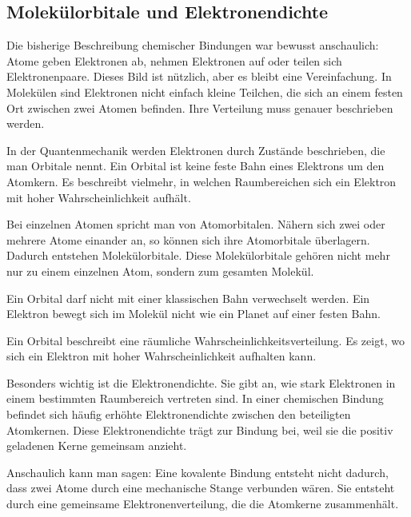 \subsection{Molekülorbitale und Elektronendichte}
\label{subsec:molekuelorbitale-elektronendichte}

Die bisherige Beschreibung chemischer Bindungen war bewusst anschaulich:
Atome geben Elektronen ab, nehmen Elektronen auf oder teilen sich
Elektronenpaare. Dieses Bild ist nützlich, aber es bleibt eine Vereinfachung.
In Molekülen sind Elektronen nicht einfach kleine Teilchen, die sich an einem
festen Ort zwischen zwei Atomen befinden. Ihre Verteilung muss genauer
beschrieben werden.

In der Quantenmechanik werden Elektronen durch Zustände beschrieben, die man
Orbitale nennt. Ein Orbital ist keine feste Bahn eines Elektrons
um den Atomkern. Es beschreibt vielmehr, in welchen Raumbereichen sich ein
Elektron mit hoher Wahrscheinlichkeit aufhält.

Bei einzelnen Atomen spricht man von Atomorbitalen. Nähern
sich zwei oder mehrere Atome einander an, so können sich ihre Atomorbitale
überlagern. Dadurch entstehen Molekülorbitale. Diese
Molekülorbitale gehören nicht mehr nur zu einem einzelnen Atom, sondern zum
gesamten Molekül.

\begin{DidacticBox}
	\label{box:orbital-keine-kreisbahn}
	Ein Orbital darf nicht mit einer klassischen Bahn verwechselt werden. Ein
	Elektron bewegt sich im Molekül nicht wie ein Planet auf einer festen Bahn.
	
	Ein Orbital beschreibt eine räumliche Wahrscheinlichkeitsverteilung. Es zeigt,
	wo sich ein Elektron mit hoher Wahrscheinlichkeit aufhalten kann.
\end{DidacticBox}

Besonders wichtig ist die Elektronendichte. Sie gibt
an, wie stark Elektronen in einem bestimmten Raumbereich vertreten sind. In
einer chemischen Bindung befindet sich häufig erhöhte Elektronendichte zwischen
den beteiligten Atomkernen. Diese Elektronendichte trägt zur Bindung bei, weil
sie die positiv geladenen Kerne gemeinsam anzieht.

Anschaulich kann man sagen: Eine kovalente Bindung entsteht nicht dadurch,
dass zwei Atome durch eine mechanische Stange verbunden wären. Sie entsteht
durch eine gemeinsame Elektronenverteilung, die die Atomkerne zusammenhält.

